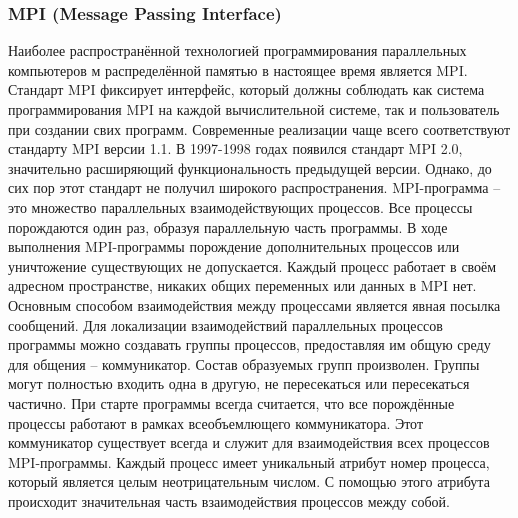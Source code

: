 \subsubsection{MPI (Message Passing Interface)}
Наиболее распространённой технологией программирования параллельных компьютеров м распределённой памятью в настоящее время является MPI. Стандарт MPI фиксирует интерфейс, который должны соблюдать как система программирования MPI на каждой вычислительной системе, так и пользователь при создании свих программ. Современные реализации чаще всего соответствуют стандарту MPI версии 1.1. В 1997-1998 годах появился стандарт MPI 2.0, значительно расширяющий функциональность предыдущей версии. Однако, до сих пор этот стандарт не получил широкого распространения.
MPI-программа – это множество параллельных взаимодействующих процессов. Все процессы порождаются один раз, образуя параллельную часть программы. В ходе выполнения MPI-программы порождение дополнительных процессов или уничтожение существующих не допускается.
Каждый процесс работает в своём адресном пространстве, никаких общих переменных или данных в MPI нет. Основным способом взаимодействия между процессами является явная посылка сообщений. Для локализации взаимодействий параллельных процессов программы можно создавать группы процессов, предоставляя им общую среду для общения – коммуникатор. Состав образуемых групп произволен. Группы могут полностью входить одна в другую, не пересекаться или пересекаться частично. При старте программы всегда считается, что все порождённые процессы работают в рамках всеобъемлющего коммуникатора. Этот коммуникатор существует всегда и служит для взаимодействия всех процессов MPI-программы.
Каждый процесс имеет уникальный атрибут номер процесса, который является целым неотрицательным числом. С помощью этого атрибута происходит значительная часть взаимодействия процессов между собой. 

